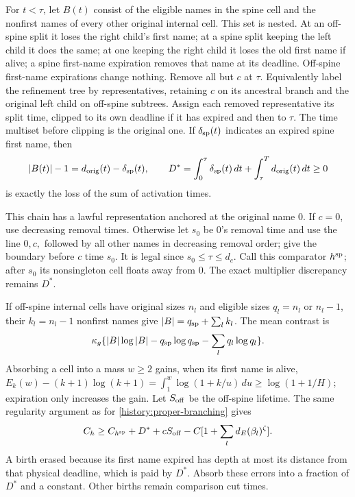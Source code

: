 For $t<\tau$, let $B(t)$ consist of the eligible names in the spine
cell and the nonfirst names of every other original internal cell.
This set is nested. At an off-spine split it loses the right child's
first name; at a spine split keeping the left child it does the same;
at one keeping the right child it loses the old first name if alive;
a spine first-name expiration removes that name at its deadline.
Off-spine first-name expirations change nothing. Remove all but $c$
at $\tau$.
Equivalently label the refinement tree by representatives, retaining
$c$ on its ancestral branch and the original left child on off-spine
subtrees. Assign each removed representative its split time, clipped
to its own deadline if it has expired and then to $\tau$. The time
multiset before clipping is the original one. If $\delta_{\rm sp}(t)$
indicates an expired spine first name, then
\[
 |B(t)|-1=d_{\rm orig}(t)-\delta_{\rm sp}(t),\qquad
 D^*=\int_0^\tau\delta_{\rm sp}(t)\,dt+
                         \int_\tau^Td_{\rm orig}(t)\,dt\ge0
\]
is exactly the loss of the sum of activation times.

This chain has a lawful representation anchored at the original name
$0$. If $c=0$, use decreasing removal times. Otherwise let $s_0$ be
$0$'s removal time and use the line $0,c,$ followed by all other names
in decreasing removal order; give the boundary before $c$ time $s_0$.
It is legal since $s_0\le\tau\le d_c$. Call this comparator
$h^{\rm sp}$; after $s_0$ its nonsingleton cell floats away from $0$.
The exact multiplier discrepancy remains $D^*$.

If off-spine internal cells have original sizes $n_l$ and eligible
sizes $q_l=n_l$ or $n_l-1$, their $k_l=n_l-1$ nonfirst names give
$|B|=q_{\rm sp}+\sum_lk_l$. The mean contrast is
\[
 \kappa_g\{|B|\log|B|-q_{\rm sp}\log q_{\rm sp}
                                      -\sum_lq_l\log q_l\}.
\]
Absorbing a cell into a mass $w\ge2$ gains, when its first name is
alive,
$E_k(w)-(k+1)\log(k+1)=\int_1^w\log(1+k/u)\,du
\ge\log(1+1/H)$; expiration only increases the gain. Let
$S_{\rm off}$ be the off-spine lifetime. The same regularity argument
as for \eqref{history:proper-branching} gives
\begin{equation}
 C_h\ge C_{h^{\rm sp}}+D^*+cS_{\rm off}
                  -C[1+\sum_l d_E(\beta_l)^\zeta].
 \label{history:floating}
\end{equation}
A birth erased because its first name expired has depth at most its
distance from that physical deadline, which is paid by $D^*$.
Absorb these errors into a fraction of $D^*$ and a constant. Other
births remain comparison cut times.

